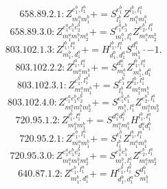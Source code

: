 \documentclass[letterpaper,10pt,fleqn,leqno,onecolumn]{article}
\begin{document}
\begin{equation} \;\;\;\;\;\;  658.89.2.1: Z^{e_{1}^{b},l_{1}^{a}}_{m_{1}^{a}m_{1}^{b}}+=S^{e_{1}^{b}}_{l_{1}^{b}}Z^{l_{1}^{b},l_{1}^{a}}_{m_{1}^{a}m_{1}^{b}} \end{equation}
\begin{equation} \;\;\;\;\;\;  658.89.3.0: Z^{e_{1}^{a}e_{1}^{b}e_{2}^{b}}_{m_{1}^{a}m_{1}^{b}m_{2}^{b}}+=S^{e_{1}^{a}e_{1}^{b}}_{m_{1}^{b},l_{1}^{a}}Z^{e_{2}^{b},l_{1}^{a}}_{m_{1}^{a}m_{2}^{b}} \end{equation}
\begin{equation} \;\;\;\;\;\;  803.102.1.3: Z^{l_{1}^{b},l_{1}^{a}}_{m_{1}^{b},d_{1}^{a}}+=H^{l_{1}^{b},l_{1}^{a}}_{d_{1}^{b},d_{1}^{a}}S^{d_{1}^{b}}_{m_{1}^{b}}\cdot -1. \end{equation}
\begin{equation} \;\;\;\;\;\;  803.102.2.2: Z^{l_{1}^{b},l_{1}^{a}}_{m_{1}^{a}m_{1}^{b}}+=S^{d_{1}^{a}}_{m_{1}^{a}}Z^{l_{1}^{b},l_{1}^{a}}_{m_{1}^{b},d_{1}^{a}} \end{equation}
\begin{equation} \;\;\;\;\;\;  803.102.3.1: Z^{e_{1}^{b},l_{1}^{a}}_{m_{1}^{a}m_{1}^{b}}+=S^{e_{1}^{b}}_{l_{1}^{b}}Z^{l_{1}^{b},l_{1}^{a}}_{m_{1}^{a}m_{1}^{b}} \end{equation}
\begin{equation} \;\;\;\;\;\;  803.102.4.0: Z^{e_{1}^{a}e_{1}^{b}e_{2}^{b}}_{m_{1}^{a}m_{1}^{b}m_{2}^{b}}+=S^{e_{1}^{a}e_{1}^{b}}_{m_{1}^{b},l_{1}^{a}}Z^{e_{2}^{b},l_{1}^{a}}_{m_{1}^{a}m_{2}^{b}} \end{equation}
\begin{equation} \;\;\;\;\;\;  720.95.1.2: Z^{l_{1}^{b},l_{1}^{a}}_{m_{1}^{a}m_{1}^{b}}+=S^{d_{1}^{a}d_{1}^{b}}_{m_{1}^{a}m_{1}^{b}}H^{l_{1}^{b},l_{1}^{a}}_{d_{1}^{a}d_{1}^{b}} \end{equation}
\begin{equation} \;\;\;\;\;\;  720.95.2.1: Z^{e_{1}^{b},l_{1}^{a}}_{m_{1}^{a}m_{1}^{b}}+=S^{e_{1}^{b}}_{l_{1}^{b}}Z^{l_{1}^{b},l_{1}^{a}}_{m_{1}^{a}m_{1}^{b}} \end{equation}
\begin{equation} \;\;\;\;\;\;  720.95.3.0: Z^{e_{1}^{a}e_{1}^{b}e_{2}^{b}}_{m_{1}^{a}m_{1}^{b}m_{2}^{b}}+=S^{e_{1}^{a}e_{1}^{b}}_{m_{1}^{b},l_{1}^{a}}Z^{e_{2}^{b},l_{1}^{a}}_{m_{1}^{a}m_{2}^{b}} \end{equation}
\begin{equation} \;\;\;\;\;\;  640.87.1.2: Z^{e_{1}^{b},l_{1}^{a}}_{m_{1}^{b},d_{1}^{a}}+=H^{e_{1}^{b},l_{1}^{a}}_{d_{1}^{b},d_{1}^{a}}S^{d_{1}^{b}}_{m_{1}^{b}} \end{equation}
\end{document}
